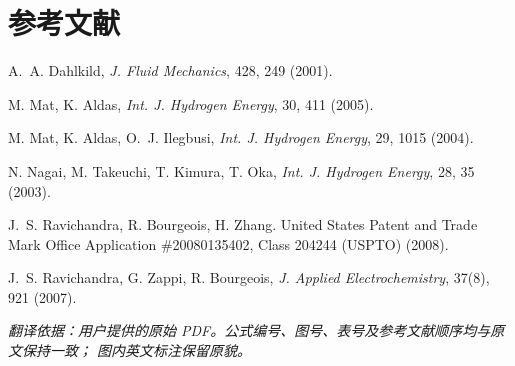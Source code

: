 \documentclass[UTF8,zihao=-4,fontset=fandol]{ctexart}
\begin{document}
\section*{参考文献}

\begin{enumerate}[label={[\arabic*]},leftmargin=2.6em,itemsep=0.25em]
  \item A.~A. Dahlkild, \emph{J. Fluid Mechanics}, 428, 249 (2001).
  \item M. Mat, K. Aldas, \emph{Int. J. Hydrogen Energy}, 30, 411 (2005).
  \item M. Mat, K. Aldas, O.~J. Ilegbusi,
    \emph{Int. J. Hydrogen Energy}, 29, 1015 (2004).
  \item N. Nagai, M. Takeuchi, T. Kimura, T. Oka,
    \emph{Int. J. Hydrogen Energy}, 28, 35 (2003).
  \item J.~S. Ravichandra, R. Bourgeois, H. Zhang.
    United States Patent and Trade Mark Office Application \#20080135402,
    Class 204244 (USPTO) (2008).
  \item J.~S. Ravichandra, G. Zappi, R. Bourgeois,
    \emph{J. Applied Electrochemistry}, 37(8), 921 (2007).
\end{enumerate}

\vfill
\begin{center}
\small\itshape
翻译依据：用户提供的原始 PDF。公式编号、图号、表号及参考文献顺序均与原文保持一致；
图内英文标注保留原貌。
\end{center}
\end{document}
